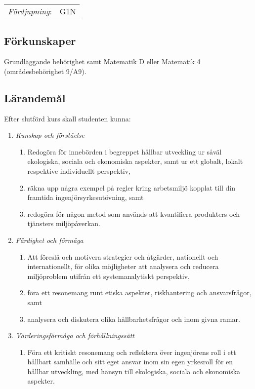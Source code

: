 \begin{tabular}{ll}
\emph{Fördjupning}: & G1N\tabularnewline
\end{tabular}

\subsection*{Förkunskaper}

Grundläggande behörighet samt Matematik D eller Matematik 4
(områdesbehörighet 9/A9).

\subsection*{Lärandemål}

Efter slutförd kurs skall studenten kunna:

\begin{enumerate}
\def\labelenumi{\Alph{enumi}.}
\tightlist
\item
  \emph{Kunskap och förståelse}

  \begin{enumerate}
  \def\labelenumii{\Alph{enumi}.\arabic{enumii}.}
  \tightlist
  \item
    Redogöra för innebörden i begreppet hållbar utveckling ur såväl
    ekologiska, sociala och ekonomiska aspekter, samt ur ett globalt,
    lokalt respektive individuellt perspektiv,
  \item
    räkna upp några exempel på regler kring arbetsmiljö kopplat till din
    framtida ingenjörsyrkesutövning, samt
  \item
    redogöra för någon metod som används att kvantifiera produkters och
    tjänsters miljöpåverkan.
  \end{enumerate}
\item
  \emph{Färdighet och förmåga}

  \begin{enumerate}
  \def\labelenumii{\Alph{enumi}.\arabic{enumii}.}
  \tightlist
  \item
    Att föreslå och motivera strategier och åtgärder, nationellt och
    internationellt, för olika möjligheter att analysera och reducera
    miljöproblem utifrån ett systemanalytiskt perspektiv,
  \item
    föra ett resonemang runt etiska aspekter, riskhantering och
    ansvarsfrågor, samt
  \item
    analysera och diskutera olika hållbarhetsfrågor och inom givna
    ramar.
  \end{enumerate}
\item
  \emph{Värderingsförmåga och förhållningssätt}

  \begin{enumerate}
  \def\labelenumii{\Alph{enumi}.\arabic{enumii}.}
  \tightlist
  \item
    Föra ett kritiskt resonemang och reflektera över ingenjörens roll i
    ett hållbart samhälle och sitt eget ansvar inom sin egen yrkesroll
    för en hållbar utveckling, med hänsyn till ekologiska, sociala och
    ekonomiska aspekter.
  \end{enumerate}
\end{enumerate}

